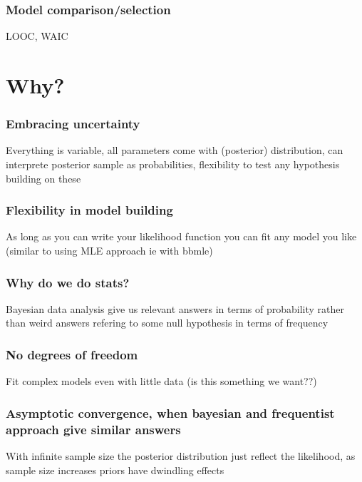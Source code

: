 \documentclass{beamer}
\begin{document}
  \begin{frame}
  \frametitle{\bf Model comparison/selection}
  
  LOOC, WAIC
  
 \end{frame}
 

\section{Why?}
 
  \begin{frame}
  \frametitle{\bf Embracing uncertainty}
  
  Everything is variable, all parameters come with (posterior) distribution, can interprete posterior sample
  as probabilities, flexibility to test any hypothesis building on these
  
 \end{frame}
 
  \begin{frame}
  \frametitle{\bf Flexibility in model building}
  
  As long as you can write your likelihood function you can fit any model you like (similar to using MLE approach
  ie with bbmle)
  
 \end{frame}
 
  \begin{frame}
  \frametitle{\bf Why do we do stats?}
  
  Bayesian data analysis give us relevant answers in terms of probability rather than weird answers refering to some null hypothesis in
  terms of frequency
  
 \end{frame}
 
  \begin{frame}
  \frametitle{\bf No degrees of freedom}
  
  Fit complex models even with little data (is this something we want??)
  
 \end{frame}
 
  \begin{frame}
  \frametitle{\bf Asymptotic convergence, when bayesian and frequentist approach give similar answers}
  
  With infinite sample size the posterior distribution just reflect the likelihood, as sample size increases
  priors have dwindling effects
  
 \end{frame}
 
\end{document}
